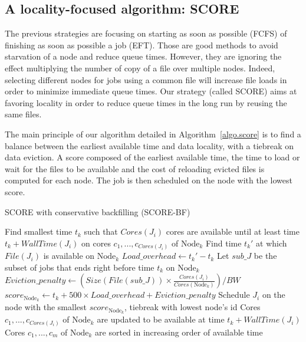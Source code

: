 \documentclass[conference,10pt]{IEEEtran}
\newcommand{\Node}[1]{\ensuremath{\mathrm{Node}_{#1}}\xspace}
\newcommand{\file}{\ensuremath{\mathit{File}}\xspace}
\newcommand{\size}{\ensuremath{\mathit{Size}}\xspace}
\newcommand{\bandwidth}{\mathit{BW}\xspace}
\newcommand{\core}{\mathit{Cores}\xspace}
\newcommand{\walltime}{\mathit{WallTime}\xspace}
\newcommand{\nodeset}{\ensuremath{\mathbb{N}}\xspace}
\begin{document}
\subsection{A locality-focused algorithm: SCORE}

The previous strategies are focusing on starting as soon as possible (FCFS)
of finishing as soon as possible a job (EFT).
Those are good methods to avoid starvation of a node and reduce queue times.
However, they are ignoring the effect multiplying the number of copy of a file
over multiple nodes. Indeed, selecting different nodes for jobs using a common
file will increase file loads in order to minimize immediate queue times.
Our strategy (called SCORE) aims at favoring locality in order to reduce
queue times in the long run by reusing the same files. 

The main principle of our algorithm detailed in Algorithm~\ref{algo.score} 
is to find a balance between the earliest available time and data locality,
with a tiebreak on data eviction. A score composed of the earliest available 
time, the time to load or wait for the files to be available and the cost of 
reloading evicted files is computed for each node. The job is then scheduled
on the node with the lowest score.


\begin{algorithm}[htbp]
\caption{SCORE with conservative backfilling (SCORE-BF)}\label{algo.score}
\begin{algorithmic}[1]
		\ForEach{$\Node{k} \in \nodeset$}
			\State Find smallest time $t_k$ such that $\core(J_i)$ cores are available until at least time $t_k + \walltime(J_i)$ on cores $c_1, ..., c_{\core(J_i)}$ of $\Node{k}$
			\State Find time $t_k'$ at which $\file(J_i)$ is available on $\Node{k}$
			\State $Load\_overhead \gets t_k' - t_k$ 
			\State Let $\mathit{sub\_J}$ be the subset of jobs that ends right before time $t_k$ on $\Node{k}$
			\State $Eviction\_penalty \gets (\size(\file(\mathit{sub\_J})) \times \frac{\core(J_i)}{\core(\Node{k})})/\bandwidth$
			\State $score_{\Node{k}} \gets t_k + 500 \times Load\_overhead + Eviction\_penalty$
		\EndFor
		\State Schedule $J_i$ on the node with the smallest $score_{\Node{k}}$, tiebreak with lowest node's id
		\State Cores $c_1, ..., c_{\core(J_i)}$ of $\Node{k}$ are updated to be available at time $t_k + \walltime(J_i)$
		\State Cores $c_1, ..., c_m$ of $\Node{k}$ are sorted in increasing order of available time
	\EndFor
\end{algorithmic}
\end{algorithm}
\end{document}
